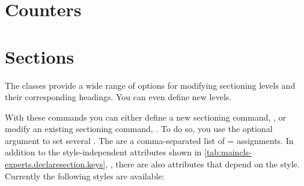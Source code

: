 \section{Counters}


\section{Sections}

The \KOMAScript{} classes provide a wide range of options for modifying
sectioning levels and their corresponding headings. You can even define new
levels.

\begin{Declaration}
\end{Declaration}
With these commands you can either define a new sectioning
command, , or modify an existing sectioning command,
. To do so, you use the optional argument to set several
. The  are a comma-separated list of
= assignments. In addition to the style-independent
attributes shown in \autoref{tab:maincls-experts.declaresection.keys},
, there are also
attributes that depend on the style. Currently the following styles are
available:
